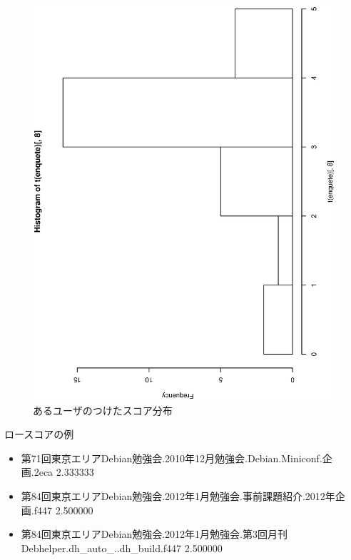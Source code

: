 \begin{frame}
\begin{figure}[h]
\begin{center}
 \includegraphics[angle=270,width=0.8\hsize]{image201301/score_hist_8.eps}

 \caption{あるユーザのつけたスコア分布}
 \label{fig:example-user-score-1}
\end{center}
\end{figure}
\end{frame}

\begin{frame}{ロースコアの例}
\begin{itemize}
 \item                 第71回東京エリアDebian勉強会.2010年12月勉強会.Debian.Miniconf.企画.2eca 
                                                                               2.333333 
 \item               第84回東京エリアDebian勉強会.2012年1月勉強会.事前課題紹介.2012年企画.f447 
                                                                               2.500000 
 \item 
       第84回東京エリアDebian勉強会.2012年1月勉強会.第3回月刊Debhelper.dh\_auto\_..dh\_build.f447 
                                                                               2.500000 

\end{itemize}
\end{frame}


